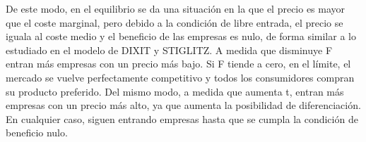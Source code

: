 \documentclass[10pt,a4paper]{article}
\begin{document}
De este modo, en el equilibrio se da una situación en la que el precio es mayor que el coste marginal, pero debido a la condición de libre entrada, el precio se iguala al coste medio y el beneficio de las empresas es nulo, de forma similar a lo estudiado en el modelo de DIXIT y STIGLITZ. A medida que disminuye F entran más empresas con un precio más bajo. Si F tiende a cero, en el límite, el mercado se vuelve perfectamente competitivo y todos los consumidores compran su producto preferido. Del mismo modo, a medida que aumenta t, entran más empresas con un precio más alto, ya que aumenta la posibilidad de diferenciación. En cualquier caso, siguen entrando empresas hasta que se cumpla la condición de beneficio nulo.
\end{document}

